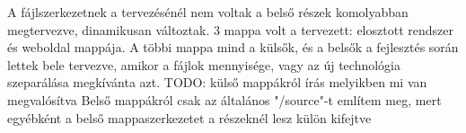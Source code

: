 
A fájlszerkezetnek a tervezésénél nem voltak a belső részek komolyabban megtervezve, dinamikusan változtak. 3 mappa volt a tervezett: elosztott rendszer és weboldal mappája. A többi mappa mind a külsők, és a belsők a fejlesztés során lettek bele tervezve, amikor a fájlok mennyisége, vagy az új technológia szeparálása megkívánta azt. 
TODO: külső mappákról írás melyikben mi van megvalósítva
Belső mappákról csak az általános "/source"-t említem meg, mert egyébként a belső mappaszerkezetet a részeknél lesz külön kifejtve